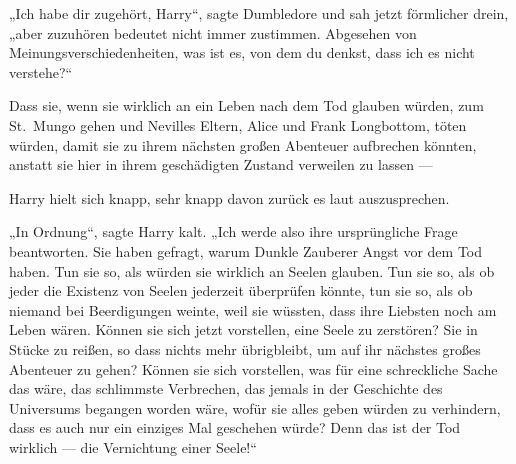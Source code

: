 „Ich habe dir zugehört, Harry“, sagte Dumbledore und sah jetzt förmlicher drein, „aber zuzuhören bedeutet nicht immer zustimmen. Abgesehen von Meinungsverschiedenheiten, was ist es, von dem du denkst, dass ich es nicht verstehe?“

Dass sie, wenn sie wirklich an ein Leben nach dem Tod glauben würden, zum St.~Mungo gehen und Nevilles Eltern, Alice und Frank Longbottom, töten würden, damit sie zu ihrem nächsten großen Abenteuer aufbrechen könnten, anstatt sie hier in ihrem geschädigten Zustand verweilen zu lassen —

Harry hielt sich knapp, sehr knapp davon zurück es laut auszusprechen.

„In Ordnung“, sagte Harry kalt.
„Ich werde also ihre ursprüngliche Frage beantworten. Sie haben gefragt, warum Dunkle Zauberer Angst vor dem Tod haben. Tun sie so, als würden sie wirklich an Seelen glauben. Tun sie so, als ob jeder die Existenz von Seelen jederzeit überprüfen könnte, tun sie so, als ob niemand bei Beerdigungen weinte, weil sie wüssten, dass ihre Liebsten noch am Leben wären. Können sie sich jetzt vorstellen, eine Seele zu zerstören? Sie in Stücke zu reißen, so dass nichts mehr übrigbleibt, um auf ihr nächstes großes Abenteuer zu gehen? Können sie sich vorstellen, was für eine schreckliche Sache das wäre, das schlimmste Verbrechen, das jemals in der Geschichte des Universums begangen worden wäre, wofür sie alles geben würden zu verhindern, dass es auch nur ein einziges Mal geschehen würde? Denn das ist der Tod wirklich — die Vernichtung einer Seele!“

